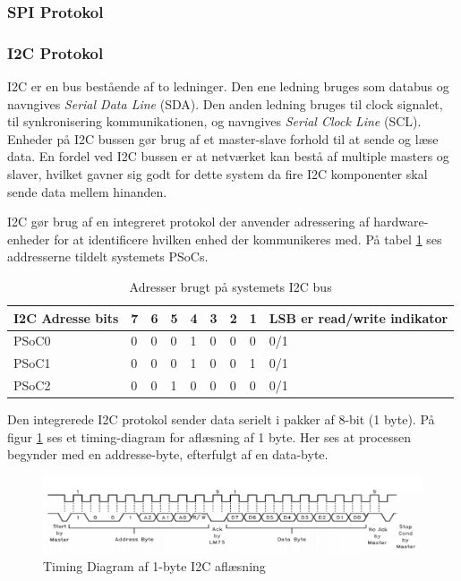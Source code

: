 \subsubsection{SPI Protokol}

\subsubsection{I2C Protokol}
\label{afsnit:I2CProtokol}

I2C\cite{I2C} er en bus bestående af to ledninger. Den ene ledning bruges som databus og navngives \textit{Serial Data Line} (SDA). Den anden ledning bruges til clock signalet, til synkronisering kommunikationen, og navngives \textit{Serial Clock Line} (SCL). Enheder på I2C bussen gør brug af et master-slave forhold til at sende og læse data. En fordel ved I2C bussen er at netværket kan bestå af multiple masters og slaver, hvilket gavner sig godt for dette system da fire I2C komponenter skal sende data mellem hinanden.

I2C gør brug af en integreret protokol der anvender adressering af hardware-enheder for at identificere hvilken enhed der kommunikeres med. På tabel \ref{table:I2CAdress} ses addresserne tildelt systemets PSoCs.

\begin{table}[H]
	\centering
	\begin{tabular}{l|lllllll|l}
		\hline
		I2C Adresse bits & 7 & 6 & 5 & 4 & 3 & 2 & 1 & LSB er read/write indikator \\ \hline
		PSoC0        & 0 & 0 & 0 & 1 & 0 & 0 & 0 & 0/1                        \\
		PSoC1        & 0 & 0 & 0 & 1 & 0 & 0 & 1 & 0/1                        \\
		PSoC2        & 0 & 0 & 1 & 0 & 0 & 0 & 0 & 0/1                        \\ \hline
	\end{tabular}
	\caption{Adresser brugt på systemets I2C bus}
	\label{table:I2CAdress}
\end{table}

Den integrerede I2C protokol sender data serielt i pakker af 8-bit (1 byte). På figur \ref{fig:I2CTimingDiagram} ses et timing-diagram for aflæsning af 1 byte. Her ses at processen  begynder med en addresse-byte, efterfulgt af en data-byte. 

\begin{figure}[H]
	\centering
	\includegraphics[width=\textwidth] {Systemarkitektur/images/I2CTimingDiagram}
	\caption{Timing Diagram af 1-byte I2C aflæsning}
	\label{fig:I2CTimingDiagram}
\end{figure}

